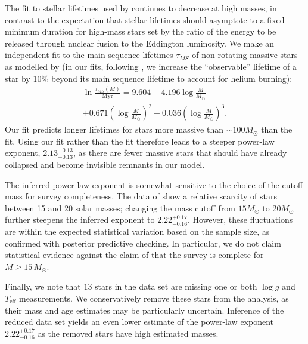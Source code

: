 \documentclass[apjl]{emulateapj}
\newcommand{\MSun}{M_\odot}
\newcommand{\onesigrange}[3]{\ensuremath{#1^{+#2}_{-#3}}}
\newcommand{\alpharangetwo}{\onesigrange{2.13}{0.13}{0.13}}
\newcommand{\alpharangethree}{\onesigrange{2.22}{0.17}{0.16}}
\begin{document}
The fit to stellar lifetimes used by \citet{Schneider:2018} continues to
decrease at high masses, in contrast to the expectation that stellar lifetimes
should asymptote to a fixed minimum duration for high-mass stars set by the
ratio of the energy to be released through nuclear fusion to the Eddington
luminosity.  We make an independent fit to the main sequence lifetimes
$\tau_{MS}$ of non-rotating massive stars as modelled by \citet{Brott:2011} (in
our fits, following \citet{Schneider:2018}, we increase the ``observable''
lifetime of a star by 10\% beyond its main sequence lifetime to account for
helium burning):
%
\begin{multline}
\ln \frac{\tau_{MS} (M)}{\textrm{Myr}} = 9.604 - 4.196 \log\frac{M}{M_\odot} \\ + 0.671 \left(\log\frac{M}{M_\odot} \right)^2 - 0.036 \left(\log\frac{M}{M_\odot}\right)^3.
\end{multline}
%
Our fit predicts longer lifetimes for stars more massive than $\sim 100 M_\odot$
than the \citet{Schneider:2018} fit.  Using our fit rather than the
\citet{Schneider:2018} fit therefore leads to a steeper power-law exponent,
$\alpharangetwo$, as there are fewer massive stars that should have already
collapsed and become invisible remnants in our model.

The inferred power-law exponent is somewhat sensitive to
the choice of the cutoff mass for survey completeness.  The data of \citet{Schneider:2018} show a relative scarcity of stars between 15 and 20 solar masses; changing the mass cutoff from $15 M_\odot$ to $20 M_\odot$ further steepens the inferred exponent to $\alpharangethree$.    However, these fluctuations are within the expected statistical
variation based on the sample size, as confirmed with posterior predictive
checking.  In particular, we do not claim statistical evidence against the claim of \citet{Schneider:2018} that
the survey is complete for $M \geq 15 \, \MSun$.

Finally, we note that $13$ stars in the \citet{Schneider:2018} data set are
missing one or both $\log g$ and $T_\textrm{eff}$ measurements.  We
conservatively remove these stars from the analysis, as their mass and age
estimates may be particularly uncertain.  Inference of the reduced data set
yields an even lower estimate of the power-law exponent $\alpharangethree$ as
the removed stars have high estimated masses.
\end{document}
